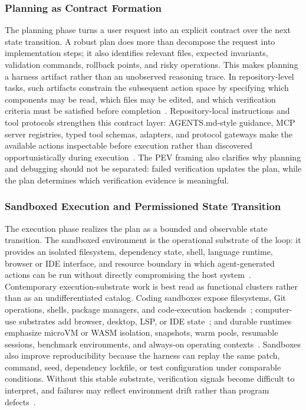 \subsubsection{Planning as Contract Formation}
The planning phase turns a user request into an explicit contract over the next state transition. A robust plan does more than decompose the request into implementation steps; it also identifies relevant files, expected invariants, validation commands, rollback points, and risky operations. This makes planning a harness artifact rather than an unobserved reasoning trace. In repository-level tasks, such artifacts constrain the subsequent action space by specifying which components may be read, which files may be edited, and which verification criteria must be satisfied before completion~\cite{jiang2024selfplanning, bairi2024codeplan, islam2024mapcoder}. Repository-local instructions and tool protocols strengthen this contract layer: AGENTS.md-style guidance, MCP server registries, typed tool schemas, adapters, and protocol gateways make the available actions inspectable before execution rather than discovered opportunistically during execution~\cite{agentsmd2026,mcpservers2026,modelcontextprotocol2026,langchainmcpadapters2026,RayASO,hou2025model,li2025glue,contextforge2026}. The PEV framing also clarifies why planning and debugging should not be separated: failed verification updates the plan, while the plan determines which verification evidence is meaningful.

\subsubsection{Sandboxed Execution and Permissioned State Transition}
The execution phase realizes the plan as a bounded and observable state transition. The sandboxed environment is the operational substrate of the loop: it provides an isolated filesystem, dependency state, shell, language runtime, browser or IDE interface, and resource boundary in which agent-generated actions can be run without directly compromising the host system~\cite{vijayvargiya2025openagentsafety, cheng2026llm}. Contemporary execution-substrate work is best read as functional clusters rather than as an undifferentiated catalog. Coding sandboxes expose filesystems, Git operations, shells, package managers, and code-execution backends~\cite{daytona2026,e2b2026,alibabaopensandbox2026,judge02026,swerex2026,wang2025openhands}; computer-use substrates add browser, desktop, LSP, or IDE state~\cite{trycua2026,browserharness2026,e2bdesktop2026,agentinfrasandbox2026,agentscoperuntime2026}; and durable runtimes emphasize microVM or WASM isolation, snapshots, warm pools, resumable sessions, benchmark environments, and always-on operating contexts~\cite{tensorlake2026,arrakis2025,capsule2026,kubernetesagentsandbox2026,sandboxedsh2026,terminalbenchenv2026,stakpakagent2026}. Sandboxes also improve reproducibility because the harness can replay the same patch, command, seed, dependency lockfile, or test configuration under comparable conditions. Without this stable substrate, verification signals become difficult to interpret, and failures may reflect environment drift rather than program defects~\cite{wang2025openhands, feng2026longcli,anthropicinfranoise2026}.

